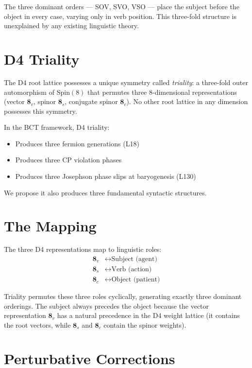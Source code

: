 \documentclass[aps,prl,twocolumn,superscriptaddress]{revtex4-2}
\begin{document}
The three dominant orders --- SOV, SVO, VSO --- place the subject before the object in every case, varying only in verb position. This three-fold structure is unexplained by any existing linguistic theory.

\section{D4 Triality}

The D4 root lattice possesses a unique symmetry called \emph{triality}: a three-fold outer automorphism of $\mathrm{Spin}(8)$ that permutes three 8-dimensional representations (vector $\mathbf{8}_v$, spinor $\mathbf{8}_s$, conjugate spinor $\mathbf{8}_c$). No other root lattice in any dimension possesses this symmetry.

In the BCT framework, D4 triality:
\begin{itemize}
\item Produces three fermion generations (L18)
\item Produces three CP violation phases
\item Produces three Josephson phase slips at baryogenesis (L130)
\end{itemize}

We propose it also produces three fundamental syntactic structures.

\section{The Mapping}

The three D4 representations map to linguistic roles:
\begin{align}
\mathbf{8}_v &\leftrightarrow \text{Subject (agent)} \\
\mathbf{8}_s &\leftrightarrow \text{Verb (action)} \\
\mathbf{8}_c &\leftrightarrow \text{Object (patient)}
\end{align}

Triality permutes these three roles cyclically, generating exactly three dominant orderings. The subject always precedes the object because the vector representation $\mathbf{8}_v$ has a natural precedence in the D4 weight lattice (it contains the root vectors, while $\mathbf{8}_s$ and $\mathbf{8}_c$ contain the spinor weights).

\section{Perturbative Corrections}
\end{document}
